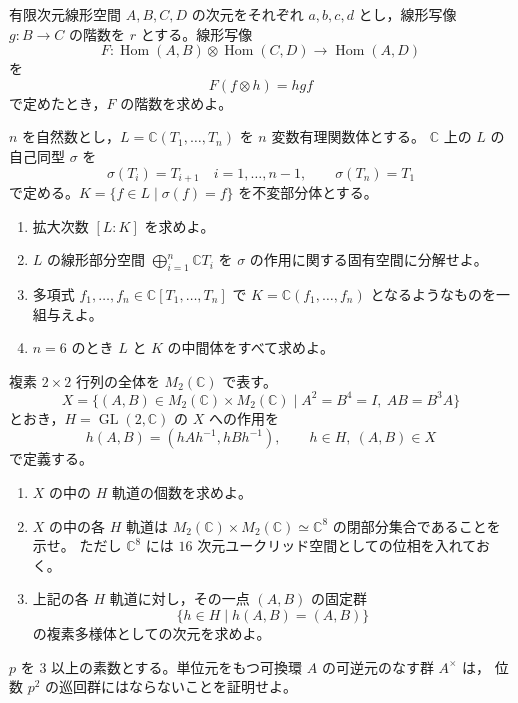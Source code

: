 \newcommand{\C}{\mathbb{C}}
\newcommand{\Hom}{\operatorname{Hom}}
\newcommand{\GL}{\operatorname{GL}}
\newcommand{\rank}{\operatorname{rank}}


有限次元線形空間 \(A,B,C,D\) の次元をそれぞれ \(a,b,c,d\) とし，線形写像
\(g:B \to C\) の階数を \(r\) とする。線形写像
\[
  F:\Hom(A,B)\otimes \Hom(C,D)
    \longrightarrow \Hom(A,D)
\]
を
\[
  F(f\otimes h)=hgf
\]
で定めたとき，\(F\) の階数を求めよ。


\(n\) を自然数とし，\(L=\C(T_1,\ldots,T_n)\) を \(n\) 変数有理関数体とする。
\(\C\) 上の \(L\) の自己同型 \(\sigma\) を
\[
  \sigma(T_i)=T_{i+1}\quad i=1,\ldots,n-1,
  \qquad
  \sigma(T_n)=T_1
\]
で定める。\(K=\{f\in L\mid \sigma(f)=f\}\) を不変部分体とする。

\begin{enumerate}
  \item 拡大次数 \([L:K]\) を求めよ。
  \item \(L\) の線形部分空間 \(\bigoplus_{i=1}^{n}\C T_i\) を \(\sigma\) の作用に関する固有空間に分解せよ。
  \item 多項式 \(f_1,\ldots,f_n \in \C[T_1,\ldots,T_n]\) で \(K=\C(f_1,\ldots,f_n)\) となるようなものを一組与えよ。
  \item \(n=6\) のとき \(L\) と \(K\) の中間体をすべて求めよ。
\end{enumerate}


複素 \(2\times2\) 行列の全体を \(M_2(\C)\) で表す。
\[
  X=\{(A,B)\in M_2(\C)\times M_2(\C)
    \mid A^2=B^4=I,\ AB=B^3A\}
\]
とおき，\(H=\GL(2,\C)\) の \(X\) への作用を
\[
  h(A,B)=(hAh^{-1},hBh^{-1}),
  \qquad h\in H,\ (A,B)\in X
\]
で定義する。

\begin{enumerate}
  \item \(X\) の中の \(H\) 軌道の個数を求めよ。
  \item \(X\) の中の各 \(H\) 軌道は
  \(M_2(\C)\times M_2(\C)\simeq \C^8\) の閉部分集合であることを示せ。
  ただし \(\C^8\) には \(16\) 次元ユークリッド空間としての位相を入れておく。
  \item 上記の各 \(H\) 軌道に対し，その一点 \((A,B)\) の固定群
  \[
    \{h\in H\mid h(A,B)=(A,B)\}
  \]
  の複素多様体としての次元を求めよ。
\end{enumerate}


\(p\) を \(3\) 以上の素数とする。単位元をもつ可換環 \(A\) の可逆元のなす群 \(A^\times\) は，
位数 \(p^2\) の巡回群にはならないことを証明せよ。
